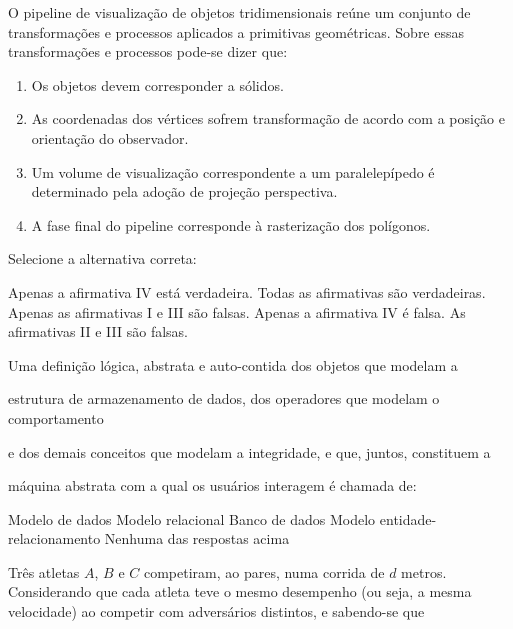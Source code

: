 \documentclass[12pt, addpoints]{exam}
\begin{document}
\begin{questions}
\question

O pipeline de visualização de objetos tridimensionais reúne um conjunto de transformações e processos aplicados a primitivas geométricas. Sobre essas transformações e processos pode-se dizer que:

\begin{enumerate}[label=\Roman*.]

    \item Os objetos devem corresponder a sólidos.

    \item As coordenadas dos vértices sofrem transformação de acordo com a posição e orientação do observador.

    \item Um volume de visualização correspondente a um paralelepípedo é determinado pela adoção de projeção perspectiva.

    \item A fase final do pipeline corresponde à rasterização dos polígonos.

\end{enumerate}

Selecione a alternativa correta:
\begin{choices}
\choice Apenas a afirmativa IV está verdadeira.
\choice Todas as afirmativas são verdadeiras.
\choice Apenas as afirmativas I e III são falsas.
\choice Apenas a afirmativa IV é falsa.
\choice As afirmativas II e III são falsas.
\end{choices}

\question

Uma definição lógica, abstrata e auto-contida dos objetos que modelam a

estrutura de armazenamento de dados, dos operadores que modelam o comportamento

e dos demais conceitos que modelam a integridade, e que, juntos, constituem a

máquina abstrata com a qual os usuários interagem é chamada de:


\begin{choices}
\choice Modelo de dados
\choice Modelo relacional
\choice Banco de dados
\choice Modelo entidade-relacionamento
\choice Nenhuma das respostas acima
\end{choices}

\question

Três atletas \( A \), \( B \) e \( C \) competiram, ao pares, numa corrida de \( d \) metros. Considerando que cada atleta teve o mesmo desempenho (ou seja, a mesma velocidade) ao competir com adversários distintos, e sabendo-se que




\end{questions}
\end{document}
